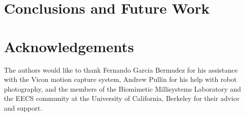 \documentclass{aamas2013}
\begin{document}
\section{Conclusions and Future Work}
\section{Acknowledgements}
The authors would like to thank Fernando Garcia Bermudez for his 
assistance with the Vicon motion capture system, Andrew Pullin for his 
help with robot photography, and the members of the Biomimetic 
Millisystems Laboratory and the EECS community at the University of 
California, Berkeley for their advice and support.






\end{document}
